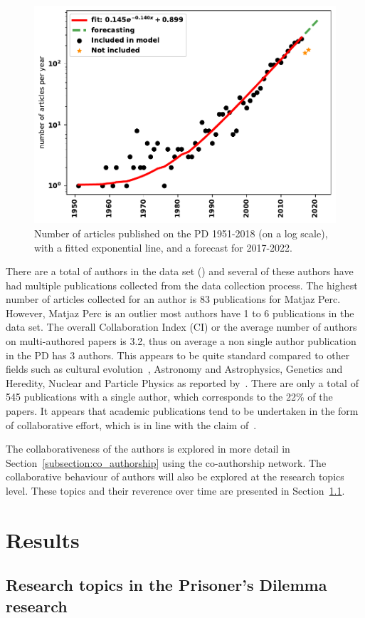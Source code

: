 \documentclass{article}
\theoremstyle{definition}
\newcommand{\authors}{}
\begin{document}
\begin{figure}[!hbtp]
    \centering
    \includegraphics[width=.50\textwidth]{./assets/images/forecasting.pdf}
    \caption{Number of articles published on the PD 1951-2018 (on a log scale),
    with a fitted exponential line, and a forecast for 2017-2022.}\label{fig:timeseries}
\end{figure}

There are a total of \authors authors in the data set (\cite{pd_data_2018}) and several of these
authors have had multiple publications collected from the data collection process.
The highest number of articles collected for an
author is 83 publications for Matjaz Perc. However, Matjaz Perc is an outlier
most authors have 1 to 6 publications in the data set.
The overall Collaboration Index (CI) or the average number of authors on
multi-authored papers is 3.2, thus on average a non single author publication in
the PD has 3 authors. This appears to be quite standard compared to other fields
such as cultural evolution~\cite{youngblood2018}, Astronomy and Astrophysics,
Genetics and Heredity, Nuclear and Particle Physics as reported
by~\cite{nature_author_blog}.
There are only a total of 545 publications with a single author, which
corresponds to the 22\% of the papers. It appears that academic publications
tend to be undertaken in the form of collaborative effort, which is in line
with the claim of~\cite{Kyvik2017}.

The collaborativeness of the authors is explored in more detail in
Section~\ref{subsection:co_authorship} using the co-authorship network. The collaborative
behaviour of authors will also be explored at the research topics level. These topics and their
reverence over time are presented in Section~\ref{subsection:research_topics}.

\section{Results}\label{section:results}

\subsection{Research topics in the Prisoner's Dilemma research}\label{subsection:research_topics}
\end{document}
